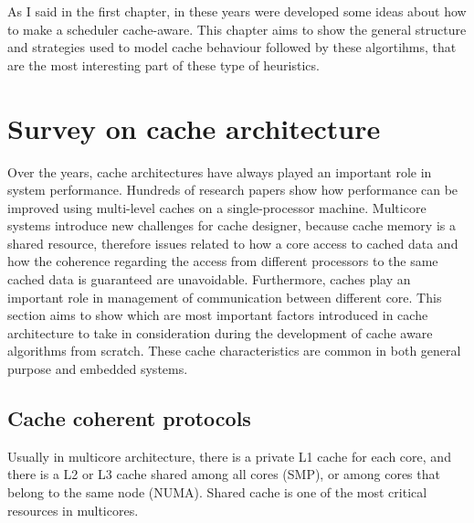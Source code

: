 As I said in the first chapter, in these years were developed some ideas about how to make a scheduler cache-aware.
This chapter aims to show the general structure and strategies used to model cache behaviour followed by these algortihms, that are the most interesting 
part of these type of heuristics.

\section{Survey on cache architecture}
\label{sec:s1}

Over the years, cache architectures have always played an important role in system performance. Hundreds of research papers show how performance
can be improved using multi-level caches on a single-processor machine. Multicore systems introduce new challenges for cache designer, because cache memory 
is a shared resource, therefore issues related to how a core access to cached data and how the coherence regarding the access from different processors 
to the same cached data is guaranteed are unavoidable. Furthermore, caches play an important role in management of communication between different core.
This section aims to show which are most important factors introduced in cache architecture to take in consideration during the development of cache aware
algorithms from scratch. These cache characteristics are common in both general purpose and embedded systems.

\subsection{Cache coherent protocols}

Usually in multicore architecture, there is a private L1 cache for each core, and there is a L2 or L3 cache shared among all cores (SMP), or among cores 
that belong to the same node (NUMA). Shared cache is one of the most critical resources in multicores.

